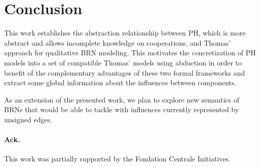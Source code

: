 \section{Conclusion}

This work establishes the abstraction relationship between PH, which is more abstract and allows incomplete knowledge on cooperations, and Thomas' approach for qualitative BRN modeling.
This motivates the concretization of PH models into a set of compatible Thomas' models using abduction in order to benefit of the complementary advantages of these two formal frameworks and extract some global information about the influences between components.

As an extension of the presented work, we plan to explore new semantics of BRNs that would be able to tackle with influences currently represented by unsigned edges.

\paragraph{Ack.}
This work was partially supported by the Fondation Centrale Initiatives.
